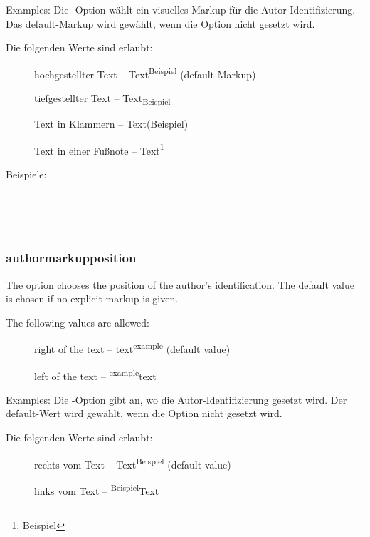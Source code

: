 	Examples:
\fi
	\ifGERMAN
		Die -Option wählt ein visuelles Markup für die Autor-Identifizierung.
		Das default-Markup wird gewählt, wenn die Option nicht gesetzt wird.

		Die folgenden Werte sind erlaubt:
		\begin{description}
			\item [] hochgestellter Text -- Text\textsuperscript{Beispiel} (default-Markup)
			\item [] tiefgestellter Text -- Text\textsubscript{Beispiel}
			\item [] Text in Klammern -- Text(Beispiel)
			\item [] Text in einer Fußnote -- Text\footnote{Beispiel}
		\end{description}

		Beispiele:
	\fi

\\
\\
\\

\subsubsection{authormarkupposition}
\ifENGLISH
	The  option chooses the position of the author's identification.
	The default value is chosen if no explicit markup is given.

	The following values are allowed:
	\begin{description}
		\item [] right of the text -- text\textsuperscript{example} (default value)
		\item [] left of the text -- \textsuperscript{example}text
	\end{description}

	Examples:
\fi
	\ifGERMAN
		Die -Option gibt an, wo die Autor-Identifizierung gesetzt wird.
		Der default-Wert wird gewählt, wenn die Option nicht gesetzt wird.

		Die folgenden Werte sind erlaubt:
		\begin{description}
			\item [] rechts vom Text -- Text\textsuperscript{Beispiel} (default value)
			\item [] links vom Text -- \textsuperscript{Beispiel}Text
		\end{description}

